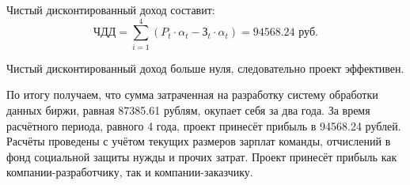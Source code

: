 Чистый дисконтированный доход составит:
\begin{equation}
    \textit{ЧДД} = \sum^{4}_{i=1} (P_t \cdot \alpha_t - \textit{З}_t \cdot \alpha_t) = 94568.24 \textrm{ руб.}
\end{equation}

Чистый дисконтированный доход больше нуля, следовательно проект эффективен.

По итогу получаем, что сумма затраченная на разработку систему обработки данных биржи, равная 87385.61 рублям, окупает себя за два года. За время расчётного периода, равного 4 года, проект принесёт прибыль в 94568.24 рублей. Расчёты проведены с учётом текущих размеров зарплат команды, отчислений в фонд социальной защиты нужды и прочих затрат. Проект принесёт прибыль как компании-разработчику, так и компании-заказчику.
